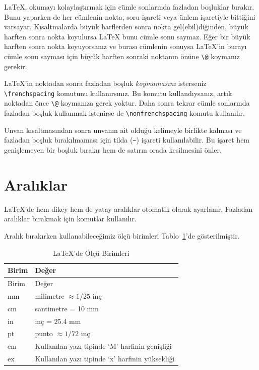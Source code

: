 \documentclass[
  letterpaper,
  DIV=11,
  numbers=noendperiod]{scrreprt}
\begin{document}
{\LaTeX}, okumayı kolaylaştırmak için cümle sonlarında fazladan
boşluklar bırakır. Bunu yaparken de her cümlenin nokta, soru işareti
veya ünlem işaretiyle bittiğini varsayar. Kısaltmalarda büyük harflerden
sonra nokta gel(ebil)diğinden, büyük harften sonra nokta koyulursa
{\LaTeX} bunu cümle sonu saymaz. Eğer bir büyük harften sonra nokta
koyuyorsanız ve burası cümlenin sonuysa {\LaTeX}'in burayı cümle sonu
sayması için büyük harften sonraki noktanın önüne
\texttt{\textbackslash{}@} koymanız gerekir.

{\LaTeX}'in noktadan sonra fazladan boşluk \emph{koymamasını} isterseniz
\texttt{\textbackslash{}frenchspacing} komutunu kullanırsınız. Bu komutu
kullandıysanız, artık noktadan önce \texttt{\textbackslash{}@} koymanıza
gerek yoktur. Daha sonra tekrar cümle sonlarında fazladan boşluk
kullanmak istenirse de \texttt{\textbackslash{}nonfrenchspacing} komutu
kullanılır.

Unvan kısaltmasından sonra unvanın ait olduğu kelimeyle birlikte kalması
ve fazladan boşluk bırakılmaması için tilda (\texttt{\textasciitilde{}})
işareti kullanılabilir. Bu işaret hem genişlemeyen bir boşluk bırakır
hem de satırın orada kesilmesini önler.

\hypertarget{aralux131klar}{%
\section{Aralıklar}\label{aralux131klar}}

{\LaTeX}'de hem dikey hem de yatay aralıklar otomatik olarak ayarlanır.
Fazladan aralıklar bırakmak için komutlar kullanılır.

Aralık bırakırken kullanabileceğimiz ölçü birimleri
Tablo~\ref{tbl-olcu}'de gösterilmiştir.

\hypertarget{tbl-olcu}{}
\begin{longtable}[]{@{}ll@{}}
\caption{\label{tbl-olcu}{\LaTeX}'de Ölçü Birimleri}\tabularnewline
\toprule()
Birim & Değer \\
\midrule()
\endfirsthead
\toprule()
Birim & Değer \\
\midrule()
\endhead
mm & milimetre \(\approx 1/25\) inç \\
cm & santimetre = 10 mm \\
in & inç = 25.4 mm \\
pt & punto \(\approx 1/72\) inç \\
em & Kullanılan yazı tipinde `M' harfinin genişliği \\
ex & Kullanılan yazı tipinde `x' harfinin yüksekliği \\
\bottomrule()
\end{longtable}
\end{document}
